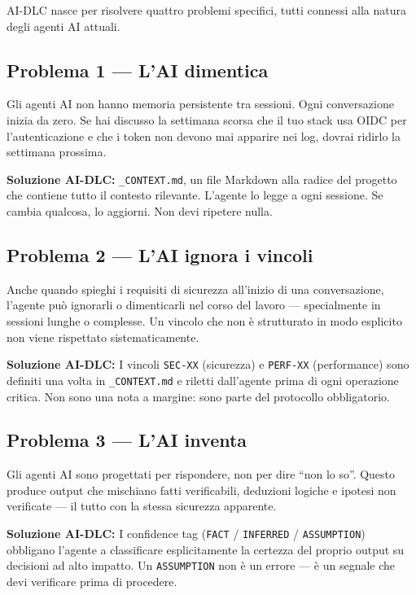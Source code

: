 AI-DLC nasce per risolvere quattro problemi specifici, tutti connessi alla natura degli agenti AI attuali.

\subsection*{Problema 1 --- L'AI dimentica}

Gli agenti AI non hanno memoria persistente tra sessioni. Ogni conversazione inizia da zero. Se hai discusso la settimana scorsa che il tuo stack usa OIDC per l'autenticazione e che i token non devono mai apparire nei log, dovrai ridirlo la settimana prossima.

\textbf{Soluzione AI-DLC:} \texttt{\_CONTEXT.md}, un file Markdown alla radice del progetto che contiene tutto il contesto rilevante. L'agente lo legge a ogni sessione. Se cambia qualcosa, lo aggiorni. Non devi ripetere nulla.

\subsection*{Problema 2 --- L'AI ignora i vincoli}

Anche quando spieghi i requisiti di sicurezza all'inizio di una conversazione, l'agente può ignorarli o dimenticarli nel corso del lavoro --- specialmente in sessioni lunghe o complesse. Un vincolo che non è strutturato in modo esplicito non viene rispettato sistematicamente.

\textbf{Soluzione AI-DLC:} I vincoli \texttt{SEC-XX} (sicurezza) e \texttt{PERF-XX} (performance) sono definiti una volta in \texttt{\_CONTEXT.md} e riletti dall'agente prima di ogni operazione critica. Non sono una nota a margine: sono parte del protocollo obbligatorio.

\subsection*{Problema 3 --- L'AI inventa}

Gli agenti AI sono progettati per rispondere, non per dire ``non lo so''. Questo produce output che mischiano fatti verificabili, deduzioni logiche e ipotesi non verificate --- il tutto con la stessa sicurezza apparente.

\textbf{Soluzione AI-DLC:} I confidence tag (\texttt{FACT} / \texttt{INFERRED} / \texttt{ASSUMPTION}) obbligano l'agente a classificare esplicitamente la certezza del proprio output su decisioni ad alto impatto. Un \texttt{ASSUMPTION} non è un errore --- è un segnale che devi verificare prima di procedere.


